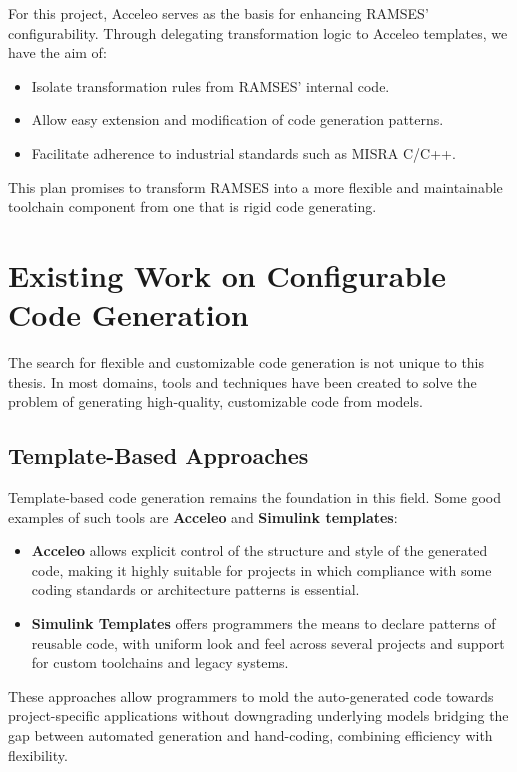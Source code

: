 For this project, Acceleo serves as the basis for enhancing RAMSES' configurability. Through delegating transformation logic to Acceleo templates, we have the aim of: 
\begin{itemize} 
	\item Isolate transformation rules from RAMSES' internal code.
	\item Allow easy extension and modification of code generation patterns.
	\item Facilitate adherence to industrial standards such as MISRA C/C++.
\end{itemize}

This plan promises to transform RAMSES into a more flexible and maintainable toolchain component from one that is rigid code generating.




\section{Existing Work on Configurable Code Generation} \label{sec:configurable_generation}

The search for flexible and customizable code generation is not unique to this thesis. In most domains, tools and techniques have been created to solve the problem of generating high-quality, customizable code from models.

\subsection*{Template-Based Approaches}

Template-based code generation remains the foundation in this field. Some good examples of such tools are \textbf{Acceleo} and \textbf{Simulink templates}: 

\begin{itemize} 
	\item \textbf{Acceleo} allows explicit control of the structure and style of the generated code, making it highly suitable for projects in which compliance with some coding standards or architecture patterns is essential. 
	\item \textbf{Simulink Templates} offers programmers the means to declare patterns of reusable code, with uniform look and feel across several projects and support for custom toolchains and legacy systems.
\end{itemize}

These approaches allow programmers to mold the auto-generated code towards project-specific applications without downgrading underlying models bridging the gap between automated generation and hand-coding, combining efficiency with flexibility.


